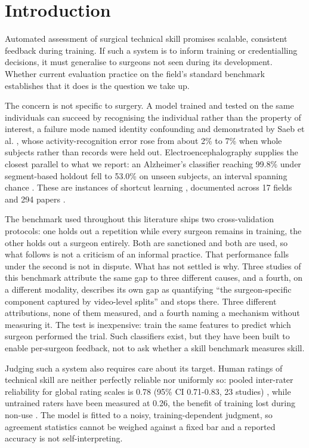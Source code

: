 \section{Introduction}

Automated assessment of surgical technical skill promises scalable, consistent feedback during training. If such a system is to inform training or credentialling decisions, it must generalise to surgeons not seen during its development. Whether current evaluation practice on the field's standard benchmark establishes that it does is the question we take up.

The concern is not specific to surgery. A model trained and tested on the same individuals can succeed by recognising the individual rather than the property of interest, a failure mode named identity confounding \cite{chaibubneto2019detecting} and demonstrated by Saeb et al. \cite{saeb2017need}, whose activity-recognition error rose from about 2\% to 7\% when whole subjects rather than records were held out. Electroencephalography supplies the closest parallel to what we report: an Alzheimer's classifier reaching 99.8\% under segment-based holdout fell to 53.0\% on unseen subjects, an interval spanning chance \cite{brookshire2024leakage}. These are instances of shortcut learning \cite{geirhos2020shortcut}, documented across 17 fields and 294 papers \cite{kapoor2023leakage}.

The benchmark used throughout this literature ships two cross-validation protocols: one holds out a repetition while every surgeon remains in training, the other holds out a surgeon entirely. Both are sanctioned and both are used, so what follows is not a criticism of an informal practice. That performance falls under the second is not in dispute. What has not settled is why. Three studies of this benchmark attribute the same gap to three different causes, and a fourth, on a different modality, describes its own gap as quantifying ``the surgeon-specific component captured by video-level splits'' and stops there. Three different attributions, none of them measured, and a fourth naming a mechanism without measuring it. The test is inexpensive: train the same features to predict which surgeon performed the trial. Such classifiers exist, but they have been built to enable per-surgeon feedback, not to ask whether a skill benchmark measures skill.

Judging such a system also requires care about its target. Human ratings of technical skill are neither perfectly reliable nor uniformly so: pooled inter-rater reliability for global rating scales is 0.78 (95\% CI 0.71-0.83, 23 studies) \cite{ilgen2015checklists}, while untrained raters have been measured at 0.26, the benefit of training lost during non-use \cite{gawad2019interrater}. The model is fitted to a noisy, training-dependent judgment, so agreement statistics cannot be weighed against a fixed bar and a reported accuracy is not self-interpreting.

